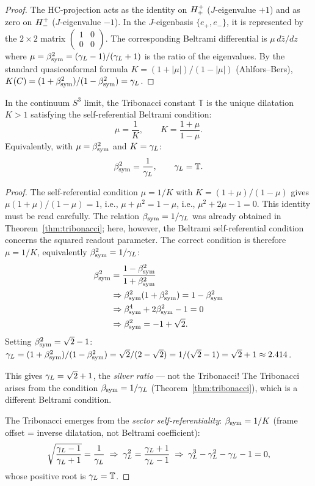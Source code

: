 \begin{proof}
The HC-projection acts as the identity on $H^+_+$ ($J$-eigenvalue $+1$)
and as zero on $H^+_-$ ($J$-eigenvalue $-1$).
In the $J$-eigenbasis $\{e_+,e_-\}$, it is represented by the
$2\times 2$ matrix $\begin{pmatrix}1&0\\0&0\end{pmatrix}$.
The corresponding Beltrami differential is $\mu\,d\bar z/dz$ where
$\mu = \beta_{\mathrm{sym}}^2 = (\gamma_L-1)/(\gamma_L+1)$ is the ratio of the eigenvalues.
By the standard quasiconformal formula
$K = (1+|\mu|)/(1-|\mu|)$ (Ahlfors--Bers),
$K(C) = (1+\beta_{\mathrm{sym}}^2)/(1-\beta_{\mathrm{sym}}^2) = \gamma_L$.
\end{proof}

\begin{theorem}
\label{thm:tribonacci-beltrami}
In the continuum $S^3$ limit, the Tribonacci constant $\mathbb{T}$
is the unique dilatation $K>1$ satisfying the self-referential
Beltrami condition:
\[
  \mu = \frac{1}{K}, \qquad K = \frac{1+\mu}{1-\mu}.
\]
Equivalently, with $\mu = \beta_{\mathrm{sym}}^2$ and $K = \gamma_L$:
\[
  \beta_{\mathrm{sym}}^2 = \frac{1}{\gamma_L},
  \qquad \gamma_L = \mathbb{T}.
\]
\end{theorem}

\begin{proof}
The self-referential condition $\mu = 1/K$ with $K = (1+\mu)/(1-\mu)$
gives $\mu(1+\mu)/(1-\mu) = 1$, i.e.,
$\mu + \mu^2 = 1 - \mu$, i.e., $\mu^2 + 2\mu - 1 = 0$.
This identity must be read carefully. The relation $\beta_{\mathrm{sym}} = 1/\gamma_L$ was already obtained in Theorem~\ref{thm:tribonacci}; here, however, the Beltrami self-referential condition concerns the squared readout parameter. The correct condition is therefore $\mu = 1/K$, equivalently $\beta_{\mathrm{sym}}^2 = 1/\gamma_L$:
\[
\begin{aligned}
\beta_{\mathrm{sym}}^2 &= \frac{1-\beta_{\mathrm{sym}}^2}{1+\beta_{\mathrm{sym}}^2}\\
&\Rightarrow \beta_{\mathrm{sym}}^2(1+\beta_{\mathrm{sym}}^2)=1-\beta_{\mathrm{sym}}^2\\
&\Rightarrow \beta_{\mathrm{sym}}^4+2\beta_{\mathrm{sym}}^2-1=0\\
&\Rightarrow \beta_{\mathrm{sym}}^2=-1+\sqrt{2}.
\end{aligned}
\]
Setting $\beta_{\mathrm{sym}}^2 = \sqrt{2}-1$: $\gamma_L = (1+\beta_{\mathrm{sym}}^2)/(1-\beta_{\mathrm{sym}}^2) = \sqrt{2}/(2-\sqrt{2}) = 1/(\sqrt{2}-1) = \sqrt{2}+1 \approx 2.414$.

This gives $\gamma_L = \sqrt{2}+1$, the \emph{silver ratio} --- not the Tribonacci!
The Tribonacci arises from the condition $\beta_{\mathrm{sym}} = 1/\gamma_L$ (Theorem~\ref{thm:tribonacci}),
which is a different Beltrami condition.

\medskip
The Tribonacci emerges from the \emph{sector self-referentiality}:
$\beta_{\mathrm{sym}} = 1/K$ (frame offset = inverse dilatation, not Beltrami coefficient):
\[
  \sqrt{\frac{\gamma_L-1}{\gamma_L+1}} = \frac{1}{\gamma_L}
  \;\Rightarrow\;
  \gamma_L^2 = \frac{\gamma_L+1}{\gamma_L-1}
  \;\Rightarrow\;
  \gamma_L^3 - \gamma_L^2 - \gamma_L - 1 = 0,
\]
whose positive root is $\gamma_L = \mathbb{T}$.
\end{proof}

